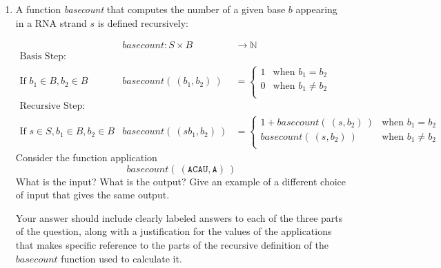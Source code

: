 \documentclass[12pt, oneside]{article}
\newcommand{\A}[0]{\texttt{A}}
\newcommand{\C}[0]{\texttt{C}}
\newcommand{\U}[0]{\texttt{U}}
\begin{document}
\begin{enumerate}[labelindent=0pt, leftmargin=0pt]
\begin{enumerate}
\item  A function \textit{basecount} that computes the number of a given base 
$b$ appearing in a RNA strand $s$ is defined recursively:
    
\[
\begin{array}{llll}
& \textit{basecount} : S \times B & \to \mathbb{N} &\\
\textrm{Basis Step:} &  \\
\textrm{If } b_1 \in B, b_2 \in B & \textit{basecount}(~(b_1, b_2)~) & = 
        \begin{cases}
            1 & \textrm{when } b_1 = b_2 \\
            0 & \textrm{when } b_1 \neq b_2 \\
        \end{cases}& \\
\textrm{Recursive Step:} & \\
\textrm{If } s \in S, b_1 \in B, b_2 \in B &\textit{basecount}(~(s b_1, b_2)~) & =
        \begin{cases}
            1 + \textit{basecount}(~(s, b_2)~) & \textrm{when } b_1 = b_2 \\
            \textit{basecount}(~(s, b_2)~) & \textrm{when } b_1 \neq b_2 \\
        \end{cases} &
\end{array}
\]
Consider the function application 
\[
  basecount( ~(\A\C\A\U, \A)~)
\]
What is the input?  What is the output? Give an example of a different choice of input that 
gives the same output.

Your answer should include clearly labeled answers to each of the three parts of the question, 
along with a justification for the values of the applications that makes specific reference to 
the parts of the recursive definition of the $basecount$ function used to calculate it.
\end{enumerate}
\end{enumerate}
\end{document}
